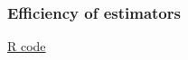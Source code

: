 \documentclass[handout]{beamer}
\begin{document}
   \begin{frame}
   \frametitle{Efficiency of estimators}
   \begin{center}
   \end{center}
   \href{http://stats191.stanford.edu/transformations.html#efficiency}{R code}
   \end{frame}


   \begin{frame} 

   \end{frame}

   
\end{document}
